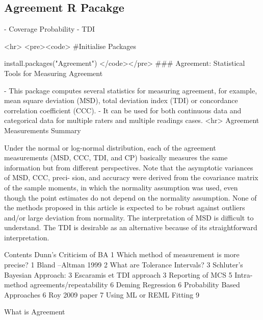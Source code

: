 \newpage


\subsection{Agreement R Pacakge}

- Coverage Probability 
- TDI

<hr>
<pre><code>
#Initialise Packages

install.packages("Agreement")
</code></pre>
### Agreement: Statistical Tools for Measuring Agreement

- This package computes several statistics for measuring agreement, for example, mean square deviation (MSD), total deviation index (TDI) or concordance correlation coefficient (CCC). 
- It can be used for both continuous data and categorical data for multiple raters and multiple readings cases.
<hr>
Agreement Measurements Summary 

Under the normal or log-normal distribution, each of the agreement measurements (MSD, CCC, TDI, and CP) 
basically measures the same information but from different perspectives. Note that the asymptotic variances 
of MSD, CCC, preci- sion, and accuracy were derived from the covariance matrix of
the sample moments, in which the normality assumption was used, even though the point estimates do not 
depend on the normality assumption. None of the methods proposed in this article is expected to be 
robust against outliers and/or large deviation from normality. The interpretation of MSD is 
difficult to understand. The TDI is desirable as an alternative because of its straightforward
interpretation. 

\newpage
Contents
Dunn’s Criticism of BA	1
Which method of measurement is more precise?	1
Bland –Altman 1999	2
What are Tolerance Intervals?	3
Schluter’s Bayesian Approach:	3
Escaramis et TDI approach	3
Reporting of MCS	5
Intra-method agreements/repeatability	6
Deming Regression	6
Probability Based Approaches	6
Roy 2009 paper	7
Using ML or REML Fitting	9


What is Agreement

